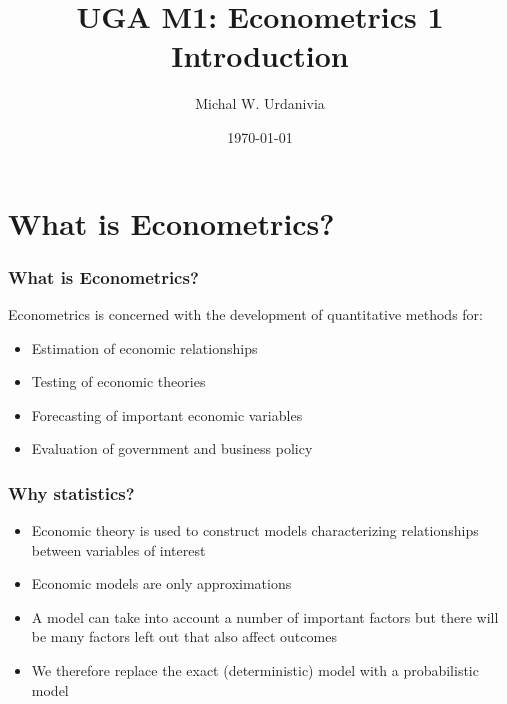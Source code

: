 

\title[Econometrics 1: Introduction]{UGA M1: Econometrics 1\\ \textbf{Introduction}}
\date{\today}
\author{Michal W. Urdanivia\inst{*}}




\frame{\titlepage}

\begin{frame}
  \tableofcontents  
\end{frame}

\section{What is Econometrics?}


\begin{frame}[allowframebreaks]\frametitle{What is Econometrics?}
  Econometrics is concerned with the development of quantitative
  methods for:
  \begin{itemize}
  \item Estimation of economic relationships
  \item Testing of economic theories
  \item Forecasting of important economic variables
  \item Evaluation of government and business policy
  \end{itemize}
\end{frame}

\begin{frame}[allowframebreaks]\frametitle{Why statistics?}
  \begin{itemize}
  \item Economic theory is used to construct models characterizing
    relationships between variables of interest
  \item Economic models are only approximations 
  \item A model can take into account a number of important factors
    but there will be many factors left out that also affect
    outcomes
  \item We therefore replace the exact (deterministic) model with a
    probabilistic model
  \end{itemize}
\end{frame}

